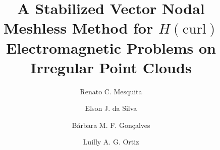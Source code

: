 \documentclass[preprint,12pt]{elsarticle}
\def\corref#1{}%
\begin{document}
\begin{frontmatter}



\title{A Stabilized Vector Nodal Meshless Method for \texorpdfstring{$H(\mathrm{curl})$}{H(curl)} Electromagnetic Problems on Irregular Point Clouds}



\author[ufmg]{Renato C. Mesquita\corref{cor1}}
\author[ufmg]{Elson J. da Silva}
\author[ufmg]{Bárbara M. F. Gonçalves}
\author[ufmg]{Luilly A. G. Ortiz}




\end{frontmatter}
\end{document}
